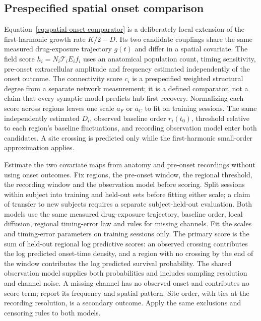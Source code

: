 \documentclass{article}
\begin{document}
\subsection{Prespecified spatial onset comparison}

Equation~\eqref{eq:spatial-onset-comparator} is a deliberately local extension of the first-harmonic growth rate $K/2-D$. Its two candidate couplings share the same measured drug-exposure trajectory $g(t)$ and differ in a spatial covariate. The field score $h_i=N_i\mathcal{T}_iE_i f_i$ uses an anatomical population count, timing sensitivity, pre-onset extracellular amplitude and frequency estimated independently of the onset outcome. The connectivity score $c_i$ is a prespecified weighted structural degree from a separate network measurement; it is a defined comparator, not a claim that every synaptic model predicts hub-first recovery. Normalizing each score across regions leaves one scale $a_F$ or $a_C$ to fit on training sessions. The same independently estimated $D_i$, observed baseline order $r_i(t_0)$, threshold relative to each region's baseline fluctuations, and recording observation model enter both candidates. A site crossing is predicted only while the first-harmonic small-order approximation applies.

Estimate the two covariate maps from anatomy and pre-onset recordings without using onset outcomes. Fix regions, the pre-onset window, the regional threshold, the recording window and the observation model before scoring. Split sessions within subject into training and held-out sets before fitting either scale; a claim of transfer to new subjects requires a separate subject-held-out evaluation. Both models use the same measured drug-exposure trajectory, baseline order, local diffusion, regional timing-error law and rules for missing channels. Fit the scales and timing-error parameters on training sessions only. The primary score is the sum of held-out regional log predictive scores: an observed crossing contributes the log predicted onset-time density, and a region with no crossing by the end of the window contributes the log predicted survival probability. The shared observation model supplies both probabilities and includes sampling resolution and channel noise. A missing channel has no observed onset and contributes no score term; report its frequency and spatial pattern. Site order, with ties at the recording resolution, is a secondary outcome. Apply the same exclusions and censoring rules to both models.
\end{document}
